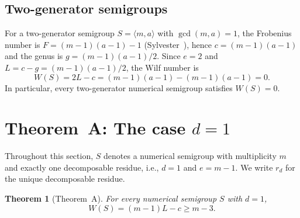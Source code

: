 \documentclass[11pt]{amsart}
\newtheorem{theorem}{Theorem}[section]
\theoremstyle{definition}
\theoremstyle{remark}
\begin{document}
\subsection{Two-generator semigroups}

For a two-generator semigroup $S = \langle m, a \rangle$ with $\gcd(m, a) = 1$,
the Frobenius number is $F = (m-1)(a-1) - 1$ (Sylvester~\cite{Sylvester1884}),
hence $c = (m-1)(a-1)$ and the genus is $g = (m-1)(a-1)/2$.
Since $e = 2$ and $L = c - g = (m-1)(a-1)/2$, the Wilf number is
\begin{equation}\label{eq:sylvester}
  W(S) = 2L - c = (m-1)(a-1) - (m-1)(a-1) = 0.
\end{equation}
In particular, every two-generator numerical semigroup satisfies $W(S) = 0$.

\section{Theorem~A: The case \texorpdfstring{$d = 1$}{d = 1}}\label{sec:thmA}

Throughout this section, $S$ denotes a numerical semigroup with multiplicity $m$
and exactly one decomposable residue, i.e., $d = 1$ and $e = m - 1$.
We write $r_d$ for the unique decomposable residue.

\begin{theorem}[Theorem~A]\label{thm:A}
For every numerical semigroup $S$ with $d = 1$,
\[
  W(S) = (m - 1) L - c \ge m - 3.
\]
\end{theorem}
\end{document}
